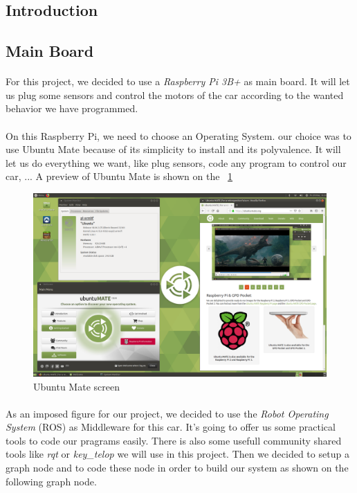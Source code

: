 
\subsection{Introduction}

\subsection{Main Board}
\paragraph{}For this project, we decided to use a \textit{Raspberry Pi 3B+}
as main board. It will let us plug some sensors and control the motors of
the car according to the wanted behavior we have programmed.

\paragraph{}On this Raspberry Pi, we need to choose an Operating System. our
choice was to use Ubuntu Mate because of its simplicity to install and its 
polyvalence. It will let us do everything we want, like plug sensors, code
any program to control our car, ... A preview of Ubuntu Mate is shown on
the ~\ref{fig:ubuntu}

\begin{figure}[!ht]
    \begin{center}
        \includegraphics[scale=0.3]{Images/Ubuntu_mate.png}
    \end{center}
    \caption{Ubuntu Mate screen}
    \label{fig:ubuntu}
\end{figure}

\paragraph{}As an imposed figure for our project, we decided to use the 
\textit{Robot Operating System} (ROS) as Middleware for this car. It's
going to offer us some practical tools to code our pragrams easily.
There is also some usefull community shared tools like \textit{rqt}
or \textit{key\_telop} we will use in this project. Then we decided to
setup a graph node and to code these node in order to build our system
as shown on the following graph node.

